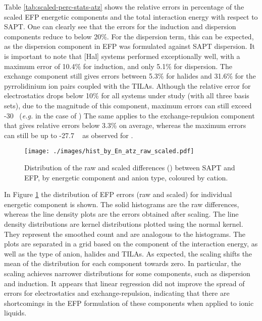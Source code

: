 Table \ref{tab:scaled-perc-stats-atz} shows the relative errors in percentage of the scaled EFP energetic components and the total interaction energy with respect to SAPT.
One can clearly see that the errors for the induction and dispersion components reduce to below 20\%.
For the dispersion term, this can be expected, as the dispersion component in EFP was formulated against SAPT dispersion.
\cite{Adamovic2005a}
It is important to note that [Hal] systems performed exceptionally well, with a maximum error of 10.4\% for induction, and only 5.1\% for dispersion.
The exchange component still gives errors between 5.3\% for  halides and 31.6\% for the pyrrolidinium ion pairs coupled with the TILAs.
Although the relative error for electrostatics drops below 10\% for all systems under study (with all three basis sets), due to the magnitude of this component, maximum errors can still exceed -30 \enUnit~(\emph{e.g.} in the case of )
The same applies to the exchange-repulsion component that gives relative errors below 3.3\% on average, whereas the maximum errors can still be up to -27.7 \enUnit~ as observed for .


\begin{figure}[h]
    \caption{Distribution of the raw and scaled differences (\enUnit) between SAPT and EFP, by energetic component and anion type, coloured by cation.}
    \label{fig:hist-raw-scaled-atz}
    \centering
    \texttt{[image: ./images/hist\_by\_En\_atz\_raw\_scaled.pdf]}
\end{figure}


In Figure \ref{fig:hist-raw-scaled-atz} the distribution of EFP errors (raw and scaled) for individual energetic component is shown.
The solid histograms are the raw differences, whereas the line density plots are the errors obtained after scaling.
The line density distributions are kernel distributions plotted using the normal kernel.
They represent the smoothed count and are analogous to the histograms.
The plots are separated in a grid based on the component of the interaction energy, as well as the type of anion, halides and TILAs.
As expected, the scaling shifts the mean of the distribution for each component towards zero.
In particular, the scaling achieves narrower distributions for some components, such as dispersion and induction.
It appears that linear regression did not improve the spread of errors for electrostatics and exchange-repulsion, indicating that there are shortcomings in the EFP formulation of these components when applied to ionic liquids.


